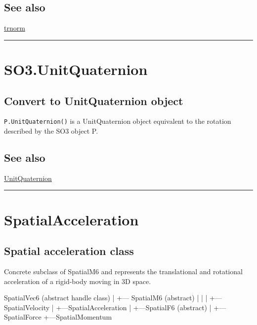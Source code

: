 \subsection*{See also}


\hyperlink{trnorm}{\color{blue} trnorm}

\vspace{1.5ex}\hrule

\hypertarget{SO3.UnitQuaternion}{\section*{SO3.UnitQuaternion}}
\subsection*{Convert to UnitQuaternion object}


\texttt{P.UnitQuaternion()} is a UnitQuaternion object equivalent to the rotation
described by the SO3 object P.


\subsection*{See also}


\hyperlink{UnitQuaternion}{\color{blue} UnitQuaternion}

\vspace{1.5ex}\rule{\textwidth}{1mm}

\hypertarget{SpatialAcceleration}{\section*{SpatialAcceleration}}
\subsection*{Spatial acceleration class}


Concrete subclass of SpatialM6 and represents the
translational and rotational acceleration of a rigid-body moving in 3D space.

\begin{Code}
    SpatialVec6 (abstract handle class)
      |
      +--- SpatialM6 (abstract)
      |     |
      |     +---SpatialVelocity
      |     +---SpatialAcceleration
      |
      +---SpatialF6 (abstract)
           |
           +---SpatialForce
           +---SpatialMomentum

\end{Code}

